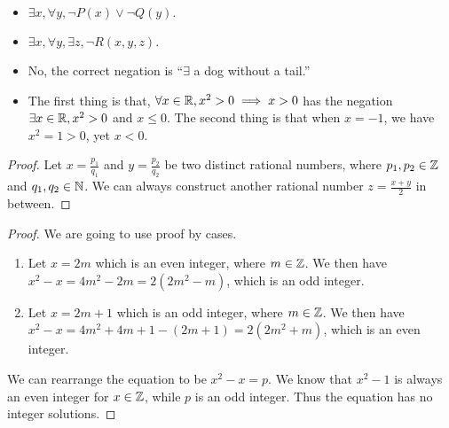 \documentclass[8pt]{article}
\begin{document}
\begin{Answer}[number=2.3.3]
  \begin{itemize}
    \item $\exists x, \forall y, \neg P(x) \lor \neg Q(y).$
    \item $\exists x, \forall y, \exists z, \neg R(x,y,z).$
  \end{itemize}
\end{Answer}

\begin{Answer}[number=2.3.4]
  \begin{itemize}
    \item No, the correct negation is ``$\exists$ a dog without a tail.''
    \item The first thing is that, $\forall x\in\mathbb{R}, x^2>0\implies x>0$ has the negation $\exists x\in
      \mathbb{R}, x^2>0$ and $x\le 0$. The second thing is that when $x = -1$, we have
      $x^2 = 1 > 0$, yet $x<0$.
  \end{itemize}
\end{Answer}

\begin{Answer}[number=2.3.7]
  \begin{proof}
    Let $x=\frac{p_1}{q_1}$ and $y=\frac{p_2}{q_2}$ be two distinct rational
    numbers, where $p_1,p_2\in \mathbb{Z}$ and $q_1,q_2\in \mathbb{N}$. We can always construct
    another rational number $z=\frac{x+y}{2}$ in between.
  \end{proof}
\end{Answer}

\begin{Answer}[number=2.3.8]
  \begin{proof}
    We are going to use proof by cases.
    \begin{enumerate}
      \item Let $x = 2m$ which is an even integer, where $m\in\mathbb{Z}$. We then have
        $x^2-x = 4m^2 - 2m = 2(2m^2 - m)$, which is an odd integer.
      \item Let $x = 2m+1$ which is an odd integer, where $m\in\mathbb{Z}$. We then have
        $x^2-x = 4m^2 + 4m + 1 - (2m + 1) = 2(2m^2 + m)$, which is an even integer.
    \end{enumerate}
    We can rearrange the equation to be $x^2-x=p$. We know that $x^2-1$ is always
    an even integer for $x\in\mathbb{Z}$, while $p$ is an odd integer. Thus the
    equation has no integer solutions.
  \end{proof}
\end{Answer}
\end{document}
